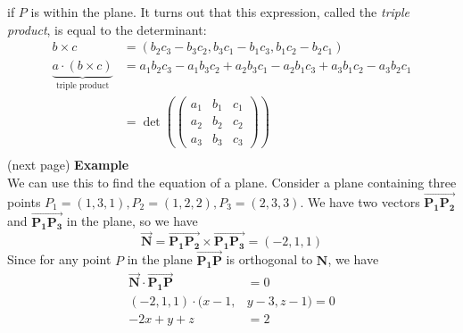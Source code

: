 \documentclass{report}
\begin{document}
if $P$ is within the plane. It turns out that this expression, called the \textit{triple product},
is equal to the determinant:
\begin{align*}
b\times c&=(b_2c_3-b_3c_2,b_3c_1-b_1c_3,b_1c_2-b_2c_1)\\
\underbrace{a\cdot(b\times c)}_{\text{triple product}}&=a_1b_2c_3-a_1b_3c_2+a_2b_3c_1-a_2b_1c_3+a_3b_1c_2-a_3b_2c_1\\
&=\det\left(
\begin{pmatrix}
a_1&b_1&c_1\\
a_2&b_2&c_2\\
a_3&b_3&c_3
\end{pmatrix}\right)\\
\end{align*}
(next page)
\newpage
\noindent\textbf{Example}\\
We can use this to find the equation of a plane. Consider a plane 
containing three points $P_1=(1,3,1), P_2=(1,2,2), P_3=(2,3,3)$. We have two vectors   
$\overrightarrow{\mathbf{P_1P_2}}$ and $\overrightarrow{\mathbf{P_1P_3}}$ in the plane, 
so we have 
\begin{equation*}
\overrightarrow{\mathbf{N}}=\overrightarrow{\mathbf{P_1P_2}}\times\overrightarrow{\mathbf{P_1P_3}}
=(-2,1,1)
\end{equation*}
Since for any point $P$ in the plane $\overrightarrow{\mathbf{P_1P}}$ is orthogonal to $\mathbf{N}$, we have
\begin{align*}
\overrightarrow{\mathbf{N}}\cdot\overrightarrow{\mathbf{P_1P}}&=0\\
(-2,1,1)\cdot(x-1,&y-3,z-1)=0\\
-2x+y+z&=2
\end{align*}
\newpage
\end{document}
